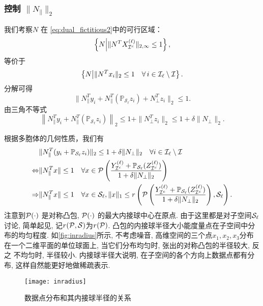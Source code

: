 \subsubsection{控制 \(\|N_{\parallel}\|_2\)}
我们考察\(N\) 在 \eqref{eq:dual_fictitious2}中的可行区域：
\[\left\{N \middle| \|N^T X^{(\ell)}_{\mathcal{I}^c}\|_{2,\infty} \leq 1\right\},\]
等价于
\[\left\{N \middle| \| N^T x_i\|_2 \leq 1 \quad \forall \, i \in \mathcal{I}_\ell
\setminus \mathcal{I} \right\}.\]
分解可得
\[\| N_{\parallel}^T y_i+N_{\parallel}^T (\mathbb{P}_{\mathcal{S}_{\ell}}z_i)+
N_{\perp}^T z_i\|_2 \leq 1.\]
由三角不等式
\begin{equation}\label{eq:relax_constraint}
  \left\| N_{\parallel}^T y_i+N_{\parallel}^T
  (\mathbb{P}_{\mathcal{S}_{\ell}}z_i)\right \|_2
  \leq 1+\|N_{\perp}^T z_i\|_2 \leq 1+\delta\|N_{\perp}\|_2.
\end{equation}

根据多胞体的几何性质，我们有
\begin{align}
  & \| N_{\parallel}^T (y_i+ \mathbb{P}_{\mathcal{S}_{\ell}}z_i) \|_2 \leq
  1+\delta\|N_{\perp}\|_2 \quad \forall i \in \mathcal{I}_\ell \setminus \mathcal{I}\nonumber\\
  \Leftrightarrow & \|N_{\parallel}^T x\| \leq 1 \quad \forall x \in \mathcal{P}\left(\frac{Y_{\mathcal{I}^c}^{(\ell)}+
  \mathbb{P}_{\mathcal{S}_{\ell}}(Z_{\mathcal{I}^c}^{(\ell)})}{1+\delta\|N_{\perp}\|_2}\right)
  \nonumber\\
  \Rightarrow & \|N_{\parallel}^T x\| \leq 1 \quad \forall x \in \mathcal{S}_\ell,
  \|x\|_1 \le r\left(\mathcal{P}\left(\frac{Y_{\mathcal{I}^c}^{(\ell)}+
  \mathbb{P}_{\mathcal{S}_{\ell}}(Z_{\mathcal{I}^c}^{(\ell)})}{1+\delta\|N_{\perp}\|_2}\right),
  \mathcal{S}_\ell\right).\label{eq:Geometric_dual}
\end{align}
注意到\(\mathcal{P}(\cdot)\) 是对称凸包, \(\mathcal{P}(\cdot)\) 的最大内接球中心在原点.
由于这里都是对子空间\(\mathcal{S}_\ell\)讨论, 简单起见, 记\(r(\mathcal{P}, \mathcal{S})\)为\(r(\mathcal{P})\).
凸包的内接球半径大小能度量点在子空间中分布的均匀程度.
如\autoref{fig:inradius}所示, 不考虑噪音, 高维空间的三个点\(x_1, x_2,
x_3\)分布在一个二维平面的单位球面上, 当它们分布均匀时, 张出的对称凸包的半径较大, 反之
不均匀时, 半径较小. 内接球半径大说明, 在子空间的各个方向上数据点都有分布,
这样自然能更好地做稀疏表示.

\begin{figure}[tb]
  \centering
  \texttt{[image: inradius]}
  \caption{数据点分布和其内接球半径的关系}
  \label{fig:inradius}
\end{figure}

